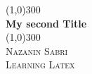 \documentclass{article}
\begin{document}
\begin{titlepage}
	\begin{center}

	\line(1,0){300}\\
	[0.25in]
	\huge{\bfseries My second Title}\\
	[2mm]
	\line(1,0){300}\\
	[1.5cm]
	\textsc{\LARGE Nazanin Sabri}\\
	[0.75cm]
	\textsc{\large Learning Latex}\\

	\end{center}
\end{titlepage}
\end{document}
